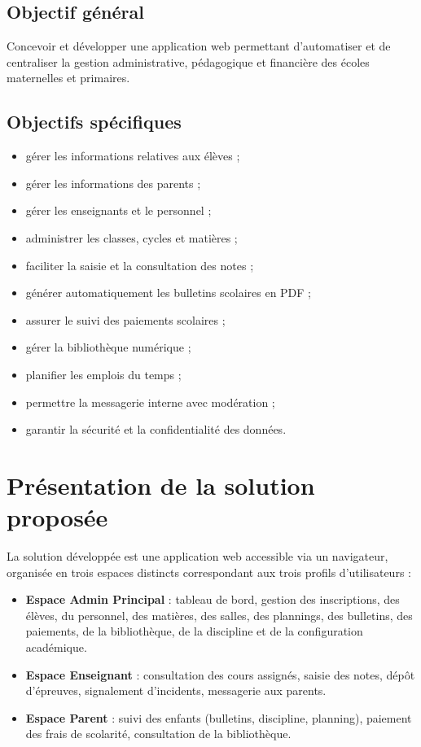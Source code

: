 \documentclass[12pt, a4paper]{report}
\begin{document}
\subsection{Objectif général}
Concevoir et développer une application web permettant d'automatiser et de centraliser la gestion administrative, pédagogique et financière des écoles maternelles et primaires.

\subsection{Objectifs spécifiques}
\begin{itemize}[noitemsep]
    \item gérer les informations relatives aux élèves ;
    \item gérer les informations des parents ;
    \item gérer les enseignants et le personnel ;
    \item administrer les classes, cycles et matières ;
    \item faciliter la saisie et la consultation des notes ;
    \item générer automatiquement les bulletins scolaires en PDF ;
    \item assurer le suivi des paiements scolaires ;
    \item gérer la bibliothèque numérique ;
    \item planifier les emplois du temps ;
    \item permettre la messagerie interne avec modération ;
    \item garantir la sécurité et la confidentialité des données.
\end{itemize}

\section{Présentation de la solution proposée}
La solution développée est une application web accessible via un navigateur, organisée en trois espaces distincts correspondant aux trois profils d'utilisateurs :

\begin{itemize}[noitemsep]
    \item \textbf{Espace Admin Principal} : tableau de bord, gestion des inscriptions, des élèves, du personnel, des matières, des salles, des plannings, des bulletins, des paiements, de la bibliothèque, de la discipline et de la configuration académique.
    \item \textbf{Espace Enseignant} : consultation des cours assignés, saisie des notes, dépôt d'épreuves, signalement d'incidents, messagerie aux parents.
    \item \textbf{Espace Parent} : suivi des enfants (bulletins, discipline, planning), paiement des frais de scolarité, consultation de la bibliothèque.
\end{itemize}
\end{document}
